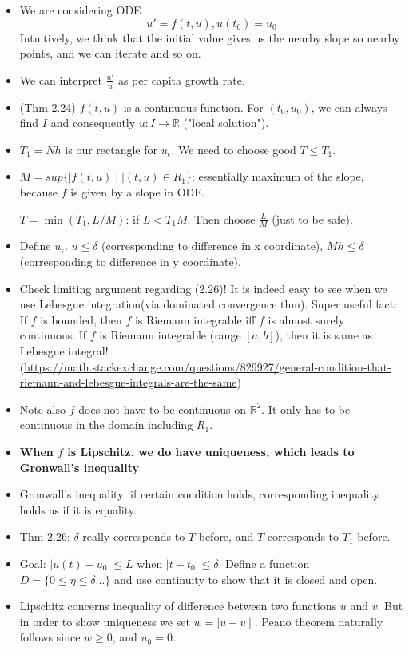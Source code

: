 \documentclass{article}
\theoremstyle{remark}
\begin{document}
\begin{itemize}
    \item We are considering ODE $$u'=f(t,u), u(t_0)=u_0$$
    Intuitively, we think that the initial value gives us the nearby slope so nearby points, and we can iterate and so on.
    \item We can interpret $\frac {u'}u$ as per capita growth rate.
    \item (Thm 2.24) $f(t,u)$ is a continuous function. For $(t_0, u_0)$, we can always find $I$ and consequently $u:I\to\mathbb{R}$ ("local solution").
    \item $T_1=Nh$ is our rectangle for $u_\epsilon$. We need to choose good $T\leq T_1$. 
    \item $M=sup\{\mid f(t,u)\mid\mid (t,u)\in R_1\}$: essentially maximum of the slope, because $f$ is given by a slope in ODE. 
    
    $T=\min (T_1, L/M)$: if $L<T_1 M$, Then choose $\frac LM$ (just to be safe).
    \item Define $u_\epsilon$. $u\leq \delta$ (corresponding to difference in x coordinate), $Mh\leq \delta$ (corresponding to difference in y coordinate).
    \item Check limiting argument regarding (2.26)!
    It is indeed easy to see when we use Lebesgue integration(via dominated convergence thm). Super useful fact: If $f$ is bounded, then $f$ is Riemann integrable iff $f$ is almost surely continuous. If $f$ is Riemann integrable (range $[a,b]$), then it is same as Lebesgue integral! (\url{https://math.stackexchange.com/questions/829927/general-condition-that-riemann-and-lebesgue-integrals-are-the-same})
    \item Note also $f$ does not have to be continuous on $\mathbb{R}^2$. It only has to be continuous in the domain including $R_1$.
    \item \textbf{When $f$ is Lipschitz, we do have uniqueness, which leads to Gronwall's inequality}
    \item Gronwall's inequality: if certain condition holds, corresponding inequality holds as if it is equality.
    \item Thm 2.26: $\delta$ really corresponds to $T$ before, and $T$ corresponds to $T_1$ before.
    \item Goal: $\mid u(t)-u_0\mid \leq L$ when $\mid t-t_0\mid\leq \delta$. Define a function $D=\{0\leq \eta\leq\delta\dots\}$ and use continuity to show that it is closed and open.
    \item Lipschitz concerns inequality of difference between two functions $u$ and $v$. But in order to show uniqueness we set $w=\mid u-v\mid$. Peano theorem naturally follows since $w\geq 0$, and $u_0=0$.
    









\end{itemize}
\end{document}
